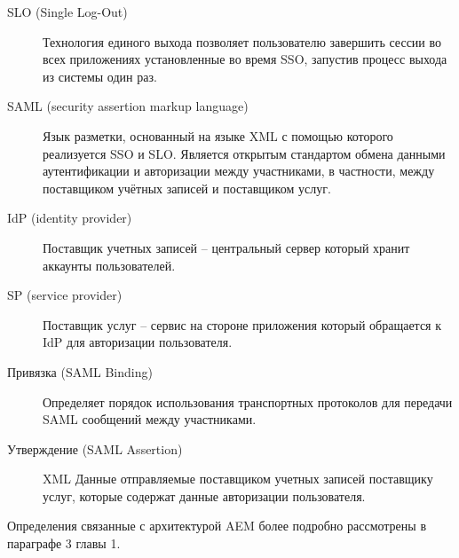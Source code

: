 \begin{description}
\item[SLO (Single Log-Out)] Технология единого выхода позволяет пользователю завершить сессии во всех приложениях установленные во время SSO, запустив процесс выхода из системы один раз.
\item[SAML (security assertion markup language)] Язык разметки, основанный на языке XML с помощью которого реализуется SSO и SLO. Является открытым стандартом обмена данными аутентификации и авторизации между участниками, в частности, между поставщиком учётных записей и поставщиком услуг.
\item[IdP (identity provider)] Поставщик учетных записей – центральный сервер который хранит аккаунты пользователей.
\item[SP (service provider)] Поставщик услуг – сервис на стороне приложения который обращается к IdP для авторизации пользователя.
\item[Привязка (SAML Binding)] Определяет порядок использования транспортных протоколов для передачи SAML сообщений между участниками.
\item[Утверждение (SAML Assertion)] XML Данные отправляемые поставщиком учетных записей поставщику услуг, которые содержат данные авторизации пользователя.
\end{description}

Определения связанные с архитектурой AEM более подробно рассмотрены в параграфе 3 главы 1.

